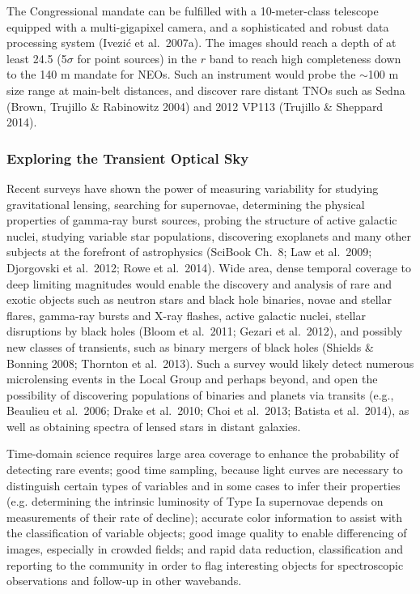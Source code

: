 \documentclass{emulateapj}
\begin{document}
The Congressional mandate can be fulfilled with a 10-meter-class
telescope equipped with a multi-gigapixel camera, and a sophisticated  
and robust data processing system (Ivezi\'{c} et al.~2007a). The images should reach a depth of at 
least 24.5 (5$\sigma$ for point sources) in the $r$ band to reach high
completeness down to the 140 m mandate for NEOs.  Such an instrument
would probe the $\sim$100 m size range at main-belt distances, and
discover rare distant TNOs such as Sedna (Brown, Trujillo \&
Rabinowitz 2004) and 2012 VP113 (Trujillo \& Sheppard 2014). 


\subsubsection{ Exploring the Transient Optical Sky}

Recent surveys have shown the power of measuring variability for studying gravitational lensing, searching 
for supernovae, determining the physical properties of gamma-ray burst sources, probing the structure of 
active galactic nuclei, studying variable star populations, discovering exoplanets 
and many other subjects at the forefront of astrophysics (SciBook
Ch.~8; Law et al.~2009; Djorgovski et al.~2012; Rowe et al.~2014). Wide area, dense
temporal coverage to deep limiting magnitudes would enable the
discovery and  
analysis of rare and exotic objects such as neutron stars and black hole binaries, novae and stellar flares, 
gamma-ray bursts and X-ray flashes, active galactic nuclei, stellar disruptions by black holes (Bloom et al.~2011;
Gezari et al.~2012), and possibly new classes of transients, such as
binary mergers of black holes (Shields \& 
Bonning 2008; Thornton et al.~2013). Such a survey would likely detect numerous microlensing events in the 
Local Group and perhaps beyond, and open the possibility of discovering populations of binaries and planets 
via transits (e.g., Beaulieu et al.~2006; Drake et al.~2010; Choi et al.~2013; Batista et al.~2014), as well as obtaining 
spectra of lensed stars in distant galaxies.

Time-domain science requires large area coverage to enhance the probability of detecting rare events; good 
time sampling, because light curves are necessary to distinguish certain types of variables and in some cases 
to infer their properties (e.g. determining the intrinsic luminosity of Type Ia supernovae depends on measurements 
of their rate of decline); accurate color information to assist with the classification of variable objects; good 
image quality to enable differencing of images, especially in crowded fields; and rapid data reduction, classification 
and reporting to the community in order to flag interesting objects
for spectroscopic observations and follow-up in other wavebands.  
\end{document}
